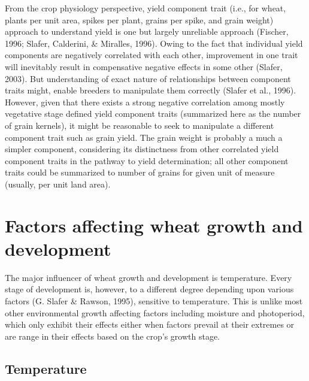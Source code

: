 \documentclass[12pt,oneside]{dukestatscithesis} %
\begin{document}
From the crop physiology perspective, yield component trait (i.e., for wheat, plants per unit area, spikes per plant, grains per spike, and grain weight) approach to understand yield is one but largely unreliable approach (Fischer, 1996; Slafer, Calderini, \& Miralles, 1996). Owing to the fact that individual yield components are negatively correlated with each other, improvement in one trait will inevitably result in compensative negative effects in some other (Slafer, 2003). But understanding of exact nature of relationships between component traits might, enable breeders to manipulate them correctly (Slafer et al., 1996). However, given that there exists a strong negative correlation among mostly vegetative stage defined yield component traits (summarized here as the number of grain kernels), it might be reasonable to seek to manipulate a different component trait such as grain yield. The grain weight is probably a much a simpler component, considering its distinctness from other correlated yield component traits in the pathway to yield determination; all other component traits could be summarized to number of grains for given unit of measure (usually, per unit land area).

\hypertarget{factors-affecting-wheat-growth-and-development}{%
\section{Factors affecting wheat growth and development}\label{factors-affecting-wheat-growth-and-development}}

The major influencer of wheat growth and development is temperature. Every stage of development is, however, to a different degree depending upon various factors (G. Slafer \& Rawson, 1995), sensitive to temperature. This is unlike most other environmental growth affecting factors including moisture and photoperiod, which only exhibit their effects either when factors prevail at their extremes or are range in their effects based on the crop's growth stage.

\hypertarget{temperature}{%
\subsection{Temperature}\label{temperature}}
\end{document}

